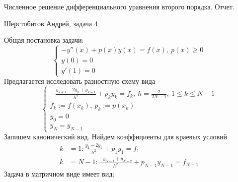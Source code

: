 \documentclass[12pt]{article}
\begin{document}
    \begin{center}
    Численное решение дифференциального уравнения второго порядка. Отчет.
    \end{center}
    \begin{center}
    Шерстобитов Андрей, задача 4
    \end{center}
    Общая постановка задачи:
    \[\begin{cases}
        -y''(x) +p(x)y(x) = f(x),\ p(x) \geq 0\\
        y(0) = 0 \\
        y'(1) = 0
    \end{cases}\]
    Предлагается исследовать разностную схему вида
    \[\begin{cases}
        -\frac{y_{k+1}-2y_k+y_{k-1}}{h^2}+p_ky_k = f_k,\ h = \frac{2}{2N-1},\ 1 \leq k \leq N-1 \\
        f_k := f(x_k),\ p_k := p(x_k) \\
        y_0 = 0 \\
        y_N = y_{N-1}
    \end{cases}\]
    Запишем канонический вид. Найдем коэффициенты для краевых условий
    \begin{align*}
        k &= 1: \frac{y_2 - 2y_1}{h^2} + p_1y_1= f_1 \\
        k &= N-1: \frac{-y_{N-1} + y_{N-2}}{h^2} + p_{N-1} y_{N-1} = f_{N-1}
    \end{align*}
    Задача в матричном виде имеет вид:
\end{document}
